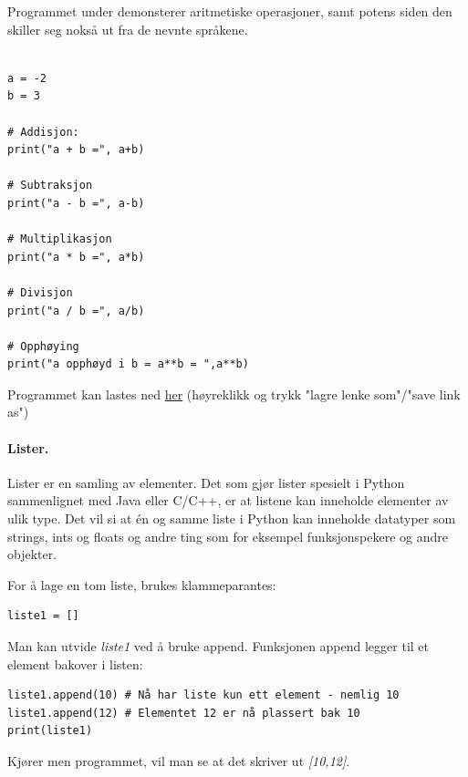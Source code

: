 \documentclass[%
oneside,                 %
final,                   %
10pt,norsk]{article}
\begin{document}
Programmet under demonsterer aritmetiske operasjoner, samt potens siden den skiller seg nokså ut fra de nevnte språkene.

\begin{verbatim}

a = -2
b = 3

# Addisjon:
print("a + b =", a+b)

# Subtraksjon
print("a - b =", a-b)

# Multiplikasjon
print("a * b =", a*b)

# Divisjon
print("a / b =", a/b)

# Opphøying
print("a opphøyd i b = a**b = ",a**b)
\end{verbatim}
Programmet kan lastes ned \href{{https://github.com/krisbhei/INF2310/raw/master/Programmering/Python/aritmetikk.py}}{her} (høyreklikk og trykk "lagre lenke som"/"save link as")

\paragraph{Lister.}
Lister er en samling av elementer. Det som gjør lister spesielt i Python sammenlignet med Java eller C/C++, er at listene kan inneholde elementer av ulik type.
Det vil si at én og samme liste i Python kan inneholde datatyper som strings, ints og floats og andre ting som for eksempel funksjonspekere og andre objekter.

For å lage en tom liste, brukes klammeparantes:
\begin{verbatim}
liste1 = []
\end{verbatim}

Man kan utvide \emph{liste1} ved å bruke append. Funksjonen append legger til et element bakover i listen:
\begin{verbatim}
liste1.append(10) # Nå har liste kun ett element - nemlig 10
liste1.append(12) # Elementet 12 er nå plassert bak 10
print(liste1)
\end{verbatim}
Kjører men programmet, vil man se at det skriver ut \emph{[10,12]}.



\vspace{3mm}
\end{document}
